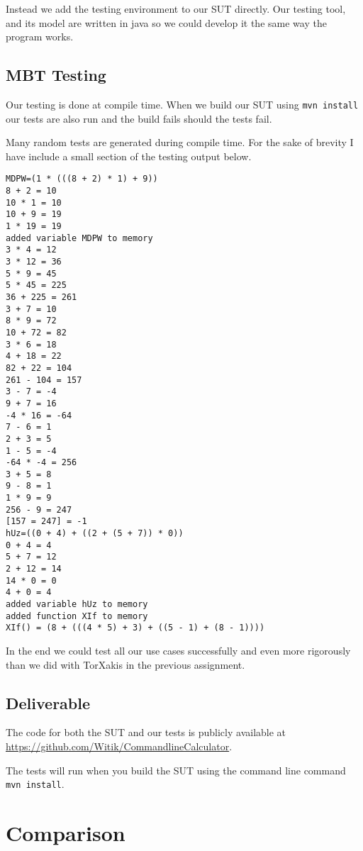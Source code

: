 \documentclass[11pt,a4paper]{article}
\begin{document}
Instead we add the testing environment to our SUT directly. Our
testing tool, and its model are written in java so we could develop it
the same way the program works.

\subsection{MBT Testing}

Our testing is done at compile time. When we build our SUT using
\verb|mvn install| our tests are also run and the build fails should
the tests fail.

Many random tests are generated during compile time. For the sake of
brevity I have include a small section of the testing output below.

\begin{verbatim}
MDPW=(1 * (((8 + 2) * 1) + 9))
8 + 2 = 10
10 * 1 = 10
10 + 9 = 19
1 * 19 = 19
added variable MDPW to memory
3 * 4 = 12
3 * 12 = 36
5 * 9 = 45
5 * 45 = 225
36 + 225 = 261
3 + 7 = 10
8 * 9 = 72
10 + 72 = 82
3 * 6 = 18
4 + 18 = 22
82 + 22 = 104
261 - 104 = 157
3 - 7 = -4
9 + 7 = 16
-4 * 16 = -64
7 - 6 = 1
2 + 3 = 5
1 - 5 = -4
-64 * -4 = 256
3 + 5 = 8
9 - 8 = 1
1 * 9 = 9
256 - 9 = 247
[157 = 247] = -1
hUz=((0 + 4) + ((2 + (5 + 7)) * 0))
0 + 4 = 4
5 + 7 = 12
2 + 12 = 14
14 * 0 = 0
4 + 0 = 4
added variable hUz to memory
added function XIf to memory
XIf() = (8 + (((4 * 5) + 3) + ((5 - 1) + (8 - 1))))
\end{verbatim}

In the end we could test all our use cases successfully and even more
rigorously than we did with TorXakis in the previous assignment.

\subsection{Deliverable}

The code for both the SUT and our tests is publicly available at
\url{https://github.com/Witik/CommandlineCalculator}.

The tests will run when you build the SUT using the command line
command \verb|mvn install|.


\section{Comparison}
\end{document}

